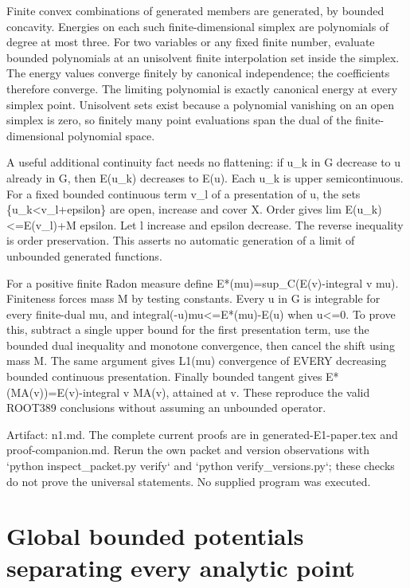 \documentclass[11pt]{article}
\begin{document}
Finite convex combinations of generated members are generated, by bounded concavity. Energies on each such finite-dimensional simplex are polynomials of degree at most three. For two variables or any fixed finite number, evaluate bounded polynomials at an unisolvent finite interpolation set inside the simplex. The energy values converge finitely by canonical independence; the coefficients therefore converge. The limiting polynomial is exactly canonical energy at every simplex point. Unisolvent sets exist because a polynomial vanishing on an open simplex is zero, so finitely many point evaluations span the dual of the finite-dimensional polynomial space.

A useful additional continuity fact needs no flattening: if u\_k in G decrease to u already in G, then E(u\_k) decreases to E(u). Each u\_k is upper semicontinuous. For a fixed bounded continuous term v\_l of a presentation of u, the sets \{u\_k<v\_l+epsilon\} are open, increase and cover X. Order gives lim E(u\_k)<=E(v\_l)+M epsilon. Let l increase and epsilon decrease. The reverse inequality is order preservation. This asserts no automatic generation of a limit of unbounded generated functions.

For a positive finite Radon measure define E*(mu)=sup\_C(E(v)-integral v mu). Finiteness forces mass M by testing constants. Every u in G is integrable for every finite-dual mu, and integral(-u)mu<=E*(mu)-E(u) when u<=0. To prove this, subtract a single upper bound for the first presentation term, use the bounded dual inequality and monotone convergence, then cancel the shift using mass M. The same argument gives L1(mu) convergence of EVERY decreasing bounded continuous presentation. Finally bounded tangent gives E*(MA(v))=E(v)-integral v MA(v), attained at v. These reproduce the valid ROOT389 conclusions without assuming an unbounded operator.

Artifact: n1.md. The complete current proofs are in generated-E1-paper.tex and proof-companion.md. Rerun the own packet and version observations with `python inspect\_packet.py verify` and `python verify\_versions.py`; these checks do not prove the universal statements. No supplied program was executed.


\section*{Global bounded potentials separating every analytic point}
\end{document}
